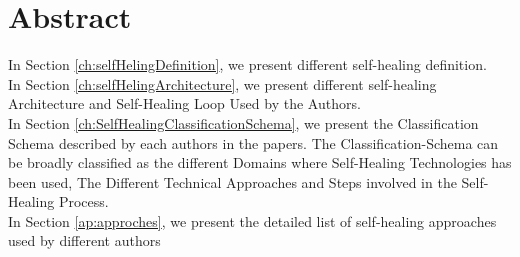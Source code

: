 \documentclass[a4paper,oneside]{scrreprt}
\begin{document}
\section*{Abstract}
In Section \ref{ch:selfHelingDefinition}, we present different self-healing definition.\\

In Section \ref{ch:selfHelingArchitecture}, we present different self-healing Architecture and Self-Healing Loop Used by the Authors.\\

In Section \ref{ch:SelfHealingClassificationSchema}, we present the Classification Schema described by each authors in the papers. The Classification-Schema can be broadly classified as the different Domains where Self-Healing Technologies has been used, The Different Technical Approaches and Steps involved in the Self-Healing Process.\\

In Section \ref{ap:approches}, we present the detailed list of self-healing approaches used by different authors \\



\begin{versionhistory}

 
\end{versionhistory}


\tableofcontents

\cleardoublepage















\end{document}
